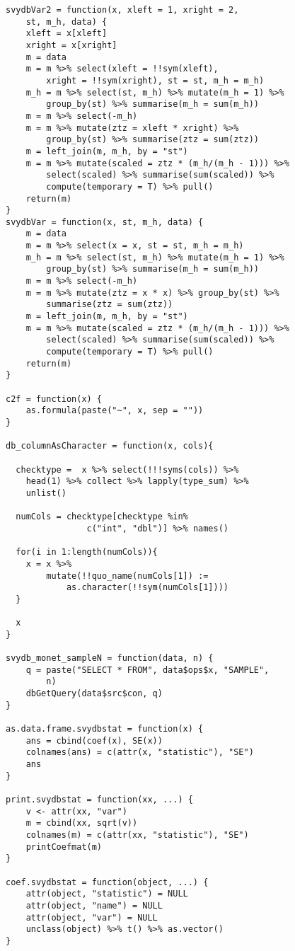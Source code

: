 \begin{lstlisting}
svydbVar2 = function(x, xleft = 1, xright = 2, 
    st, m_h, data) {
    xleft = x[xleft]
    xright = x[xright]
    m = data
    m = m %>% select(xleft = !!sym(xleft), 
        xright = !!sym(xright), st = st, m_h = m_h)
    m_h = m %>% select(st, m_h) %>% mutate(m_h = 1) %>% 
        group_by(st) %>% summarise(m_h = sum(m_h))
    m = m %>% select(-m_h)
    m = m %>% mutate(ztz = xleft * xright) %>% 
        group_by(st) %>% summarise(ztz = sum(ztz))
    m = left_join(m, m_h, by = "st")
    m = m %>% mutate(scaled = ztz * (m_h/(m_h - 1))) %>% 
        select(scaled) %>% summarise(sum(scaled)) %>% 
        compute(temporary = T) %>% pull()
    return(m)
}
svydbVar = function(x, st, m_h, data) {
    m = data
    m = m %>% select(x = x, st = st, m_h = m_h)
    m_h = m %>% select(st, m_h) %>% mutate(m_h = 1) %>% 
        group_by(st) %>% summarise(m_h = sum(m_h))
    m = m %>% select(-m_h)
    m = m %>% mutate(ztz = x * x) %>% group_by(st) %>% 
        summarise(ztz = sum(ztz))
    m = left_join(m, m_h, by = "st")
    m = m %>% mutate(scaled = ztz * (m_h/(m_h - 1))) %>% 
        select(scaled) %>% summarise(sum(scaled)) %>% 
        compute(temporary = T) %>% pull()
    return(m)
}

c2f = function(x) {
    as.formula(paste("~", x, sep = ""))
}

db_columnAsCharacter = function(x, cols){
  
  checktype =  x %>% select(!!!syms(cols)) %>% 
    head(1) %>% collect %>% lapply(type_sum) %>% 
    unlist()
  
  numCols = checktype[checktype %in% 
                c("int", "dbl")] %>% names()
  
  for(i in 1:length(numCols)){
    x = x %>% 
        mutate(!!quo_name(numCols[1]) := 
            as.character(!!sym(numCols[1])))
  }
  
  x
}

svydb_monet_sampleN = function(data, n) {
    q = paste("SELECT * FROM", data$ops$x, "SAMPLE", 
        n)
    dbGetQuery(data$src$con, q)
}

as.data.frame.svydbstat = function(x) {
    ans = cbind(coef(x), SE(x))
    colnames(ans) = c(attr(x, "statistic"), "SE")
    ans
}

print.svydbstat = function(xx, ...) {
    v <- attr(xx, "var")
    m = cbind(xx, sqrt(v))
    colnames(m) = c(attr(xx, "statistic"), "SE")
    printCoefmat(m)
}

coef.svydbstat = function(object, ...) {
    attr(object, "statistic") = NULL
    attr(object, "name") = NULL
    attr(object, "var") = NULL
    unclass(object) %>% t() %>% as.vector()
}


\end{lstlisting}
